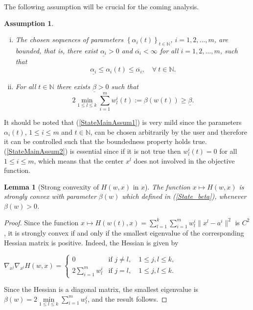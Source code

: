 \documentclass[11pt]{article}
\numberwithin{equation}{section}
\newtheorem{lemma}{Lemma}[proposition]
\newtheorem{assumption}{Assumption}
\begin{document}
The following assumption will be crucial for the coming analysis.
\begin{assumption} \label{StateMainAssum}
\begin{enumerate}[(i)] 
	\item The chosen sequences of parameters $\left\lbrace \alpha_i(t) \right\rbrace_{t \in \mathbb{N}}$, $i=1,2, \ldots, m$, are bounded, that is, there exist $\underline{\alpha_i} > 0$ and $\overline{\alpha_i} < \infty$ for all $i=1,2, \ldots, m$, such that
		\begin{equation}
			\underline{\alpha_i} \leq \alpha_i(t) \leq \overline{\alpha_i}, \quad \forall \: t \in \mathbb{N}.
		\end{equation}		 \label{StateMainAssum1}
	\item For all $t \in \mathbb{N}$ there exists $\underline{\beta} > 0$ such that
		\begin{equation}
			2 \min\limits_{1 \leq l \leq k} \sum\limits_{i=1}^{m} w^i_l(t) := \beta(w(t)) \geq \underline{\beta}. \label{State_beta}
		\end{equation}		 \label{StateMainAssum2}
\end{enumerate}
\end{assumption}
It should be noted that (\ref{StateMainAssum1}) is very mild since the parameters $\alpha_i(t)$, $1 \leq i \leq m$ and $t \in \mathbb{N}$, can be chosen arbitrarily by the user and therefore it can be controlled such that the boundedness property holds true. (\ref{StateMainAssum2}) is essential since if it is not true then $w^i_l(t)=0$ for all $1 \leq i \leq m$, which means that the center $x^l$ does not involved in the objective function.

\begin{lemma}[Strong convexity of $H(w,x)$ in $x$] \label{StateEq14}
The function $x \mapsto H(w,x)$ is strongly convex with parameter $\beta(w)$ which defined in (\ref{State_beta}), whenever $\beta(w) > 0$.
\end{lemma}

\begin{proof}
Since the function $x \mapsto H(w(t),x) = 
\sum\limits_{l=1}^{k} \sum\limits_{i=1}^{m} w^i_l \|x^l - a^i\|^2$ is $C^2$, it is strongly convex if and only if the smallest eigenvalue of the corresponding Hessian matrix is positive. Indeed, the Hessian is given by

\begin{center}
$\nabla_{x^j} \nabla_{x^l} H(w,x) = 
\begin{cases} 0 &\mbox{if } j \neq l, \quad 1 \leq j,l \leq k ,
\\ 2\sum\limits_{i=1}^{m} w^i_l &\mbox{if } j = l, \quad 1 \leq j,l \leq k. \end{cases} $
\end{center}

Since the Hessian is a diagonal matrix, the smallest eigenvalue is $\beta(w) = 2\min\limits_{1 \leq l \leq k} \sum\limits_{i=1}^{m} w^i_l$, and the result follows.
\end{proof}
\end{document}
